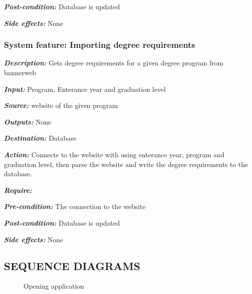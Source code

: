 \documentclass[twoside,letterpaper]{article}
\newcommand{\featuresection}[1] {
\subsubsection[System feature: #1]{\selectlanguage{english}\rmfamily\bfseries\color{black} System feature: #1}
}
\begin{document}
{\emph{\textbf{Post-condition: }} Database is updated

\emph{\textbf{Side effects:}} None



\featuresection{Importing degree requirements}
\label{sssec:importDegree}

\emph{\textbf{Description:}} Gets degree requirements for a given degree program from bannerweb

\emph{\textbf{Input:}}  Program, Enterance year and graduation level

\emph{\textbf{Source:}} website of the given program

\emph{\textbf{Outputs:}} None

\emph{\textbf{Destination:}} Database

\emph{\textbf{Action:}} Connects to the website with using enterance year, program and graduation level, then parse the website and write the degree requirements to the database.  

\emph{\textbf{Require:}}

\emph{\textbf{Pre-condition: }} The connection to the website

\emph{\textbf{Post-condition: }} Database is updated

\emph{\textbf{Side effects:}} None

\clearpage
\subsection[SEQUENCE DIAGRAMS]{\rmfamily\bfseries\color{black}
SEQUENCE DIAGRAMS}

\begin{figure}[h!]
\centering
{}
\caption{Opening application}
\label{fig:openAppDiagram}
\end{figure}

}
\end{document}
